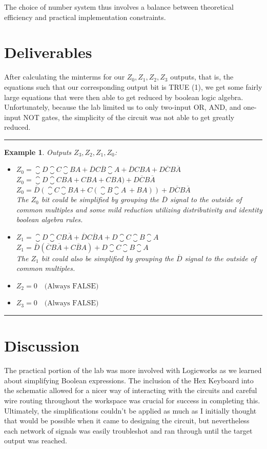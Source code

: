 \documentclass[12pt]{report}
\newtheorem{example}{Example}
\newenvironment{examp}
{
    \vspace{0.5cm}
    \hrule
    \begin{example}
}
{
    \hrule
    \vspace{0.5cm}
    \end{example}
}
\begin{document}
The choice of number system thus involves a balance between theoretical efficiency and practical implementation constraints.

\section*{Deliverables}
After calculating the minterms for our \(Z_{0}, Z_{1}, Z_{2}, Z_{3}\) outputs, that is, the equations such that our corresponding output bit is TRUE (1), we get some fairly large equations that were then able to get reduced by boolean logic algebra. Unfortunately, because the lab limited us to only two-input OR, AND, and one-input NOT gates, the simplicity of the circuit was not able to get greatly reduced.
\begin{examp}
	Outputs \( Z_3, Z_2, Z_1, Z_0 \):
	\begin{itemize}
		\item \( Z_0 = \closure{D}\closure{C}\closure{B}A + \overline{D}C\overline{B}\closure{A} + \overline{D}CBA + D\overline{C}B\overline{A} \) \\
		      \( Z_0 = \closure{D}\closure{C}BA + C{B A} + CBA) + D\overline{C}B\overline{A} \) \\
		      \( Z_0 = \overline{D}(\closure{C}\closure{B}A + C(\closure{B}\closure{A}\ + BA)) + D\overline{C}B\overline{A} \) \\
		      The \( Z_0 \) bit could be simplified by grouping the \( \overline{D} \) signal to the outside of common multiples and some mild reduction utilizing distributivity and identity boolean algebra rules.
		\item \( Z_1 = \closure{D}\closure{C}B\overline{A} + \overline{D}C\overline{B}A + D\closure{C}\closure{B}\closure{A}\) \\
		      \( Z_1 = \overline{D}(\overline{C}B\overline{A} + C\overline{B}A) + D\closure{C}\closure{B}\closure{A}\) \\
		      The \( Z_1 \) bit could also be simplified by grouping the \( \overline{D} \) signal to the outside of common multiples. \

		\item \( Z_2 = 0 \quad \text{(Always FALSE)} \)

		\item \( Z_3 = 0 \quad \text{(Always FALSE)} \)
	\end{itemize}
\end{examp}
\section*{Discussion}
The practical portion of the lab was more involved with Logicworks as we learned about simplifying Boolean expressions. The inclusion of the Hex Keyboard into the schematic allowed for a nicer way of interacting with the circuits and careful wire routing throughout the workspace was crucial for success in completing this. Ultimately, the simplifications couldn't be applied as much as I initially thought that would be possible when it came to designing the circuit, but nevertheless each network of signals was easily troubleshot and ran through until the target output was reached.
\end{document}

